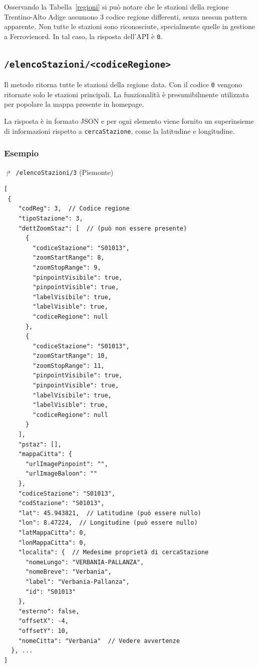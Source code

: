 \documentclass[12pt,a4paper,italian]{report}
\begin{document}
Osservando la Tabella~\ref{regioni} si può notare che le stazioni
della regione Trentino-Alto Adige assumono 3 codice regione
differenti, senza nessun pattern apparente.  Non tutte le stazioni
sono riconosciute, specialmente quelle in gestione a Ferrovienord.  In
tal caso, la risposta dell'API è \texttt{0}.

\subsection{\texttt{/elencoStazioni/<codiceRegione>}}
\label{elencoStazioni}

Il metodo ritorna tutte le stazioni della regione data.  Con il codice
\texttt{0} vengono ritornate solo le stazioni principali.  La
funzionalità è presumibilmente utilizzata per popolare la mappa
presente in homepage.

La risposta è in formato JSON e per ogni elemento viene fornito un
superinsieme di informazioni rispetto a \texttt{cercaStazione}, come
la latitudine e longitudine.

\subsubsection{Esempio}

$\Rsh$ \texttt{/elencoStazioni/3} \hfill (Piemonte)
\begin{verbatim}
[
 {
    "codReg": 3,  // Codice regione
    "tipoStazione": 3,
    "dettZoomStaz": [  // (può non essere presente)
      {
        "codiceStazione": "S01013",
        "zoomStartRange": 8,
        "zoomStopRange": 9,
        "pinpointVisibile": true,
        "pinpointVisible": true,
        "labelVisibile": true,
        "labelVisible": true,
        "codiceRegione": null
      },
      {
        "codiceStazione": "S01013",
        "zoomStartRange": 10,
        "zoomStopRange": 11,
        "pinpointVisibile": true,
        "pinpointVisible": true,
        "labelVisibile": true,
        "labelVisible": true,
        "codiceRegione": null
      }
    ],
    "pstaz": [],
    "mappaCitta": {
      "urlImagePinpoint": "",
      "urlImageBaloon": ""
    },
    "codiceStazione": "S01013",
    "codStazione": "S01013",
    "lat": 45.943821,  // Latitudine (può essere nullo)
    "lon": 8.47224,  // Longitudine (può essere nullo)
    "latMappaCitta": 0,
    "lonMappaCitta": 0,
    "localita": {  // Medesime proprietà di cercaStazione
      "nomeLungo": "VERBANIA-PALLANZA",
      "nomeBreve": "Verbania",
      "label": "Verbania-Pallanza",
      "id": "S01013"
    },
    "esterno": false,
    "offsetX": -4,
    "offsetY": 10,
    "nomeCitta": "Verbania"  // Vedere avvertenze
  }, ...
]
\end{verbatim}
\end{document}
